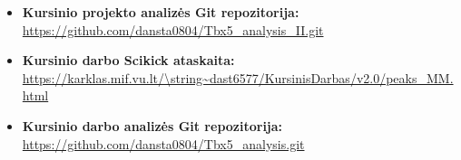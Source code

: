 \documentclass[12pt]{article}
\begin{document}
\begin{itemize}
    \item \textbf{Kursinio projekto analizės Git repozitorija:}\\
        \url{https://github.com/dansta0804/Tbx5\_analysis\_II.git}
    \item \textbf{Kursinio darbo Scikick ataskaita:}\\
        \url{https://karklas.mif.vu.lt/\string~dast6577/KursinisDarbas/v2.0/peaks\_MM.html}
    \item \textbf{Kursinio darbo analizės Git repozitorija:}\\
        \url{https://github.com/dansta0804/Tbx5\_analysis.git}
\end{itemize}
\end{document}
